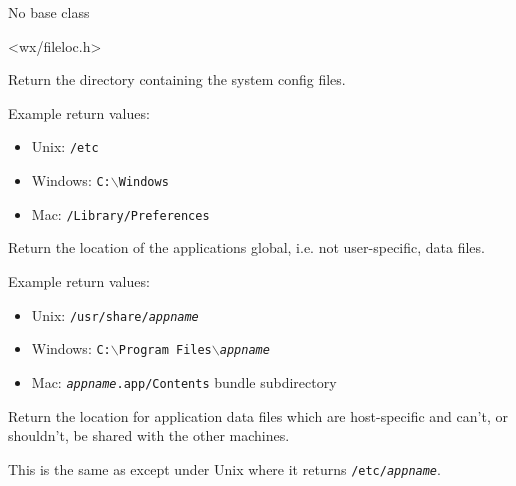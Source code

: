 
No base class


<wx/fileloc.h>




\label{wxstandardsathsgetconfigdir}


Return the directory containing the system config files.

Example return values:
\begin{itemize}
    \item Unix: \texttt{/etc}
    \item Windows: \texttt{C:$\backslash$Windows}
    \item Mac: \texttt{/Library/Preferences}
\end{itemize}




\label{wxstandardsathsgetdatadir}


Return the location of the applications global, i.e. not user-specific,
data files.

Example return values:
\begin{itemize}
    \item Unix: \texttt{/usr/share/\textit{appname}}
    \item Windows: \texttt{C:$\backslash$Program Files$\backslash$\textit{appname}}
    \item Mac: \texttt{\textit{appname}.app/Contents} bundle subdirectory
\end{itemize}




\label{wxstandardsathsgetlocaldatadir}


Return the location for application data files which are host-specific and
can't, or shouldn't, be shared with the other machines.

This is the same as  except
under Unix where it returns \texttt{/etc/\textit{appname}}.


